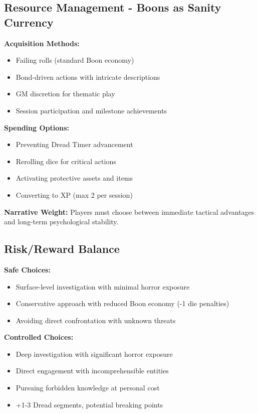 \documentclass[11pt]{article}
\begin{document}
\subsection{Resource Management - Boons as Sanity Currency}

\textbf{Acquisition Methods:}
\begin{itemize}
\item Failing rolls (standard Boon economy)
\item Bond-driven actions with intricate descriptions
\item GM discretion for thematic play
\item Session participation and milestone achievements
\end{itemize}

\textbf{Spending Options:}
\begin{itemize}
\item Preventing Dread Timer advancement
\item Rerolling dice for critical actions
\item Activating protective assets and items
\item Converting to XP (max 2 per session)
\end{itemize}

\textbf{Narrative Weight:} Players must choose between immediate tactical advantages and long-term psychological stability.

\subsection{Risk/Reward Balance}

\textbf{Safe Choices:}
\begin{itemize}
\item Surface-level investigation with minimal horror exposure
\item Conservative approach with reduced Boon economy (-1 die penalties)
\item Avoiding direct confrontation with unknown threats
\end{itemize}

\textbf{Controlled Choices:}
\begin{itemize}
\item Deep investigation with significant horror exposure
\item Direct engagement with incomprehensible entities
\item Pursuing forbidden knowledge at personal cost
\item +1-3 Dread segments, potential breaking points
\end{itemize}
\end{document}
